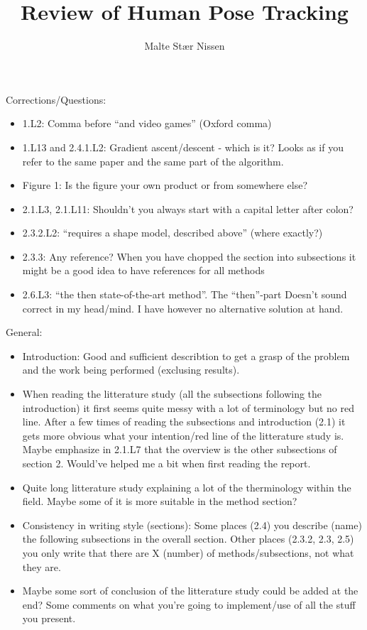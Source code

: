 \documentclass[11pt,a4paper]{article}
\title{Review of Human Pose Tracking}
\author{Malte Stær Nissen}
\begin{document}
\maketitle

\noindent Corrections/Questions:
\begin{itemize}
    \item 1.L2: Comma before ``and video games'' (Oxford comma)
    \item 1.L13 and 2.4.1.L2: Gradient ascent/descent - which is it? Looks as if you refer to
        the same paper and the same part of the algorithm.
    \item Figure 1: Is the figure your own product or from somewhere else?
    \item 2.1.L3, 2.1.L11: Shouldn't you always start with a capital letter after colon?
    \item 2.3.2.L2: ``requires a shape model, described above'' (where exactly?)
    \item 2.3.3: Any reference? When you have chopped the section into
        subsections it might be a good idea to have references for all
        methods
    \item 2.6.L3: ``the then state-of-the-art method''. The ``then''-part Doesn't sound correct
        in my head/mind. I have however no alternative solution at hand.
\end{itemize}

\noindent General:
\begin{itemize}
    \item Introduction: Good and sufficient describtion to get a grasp of the
        problem and the work being performed (exclusing results).
    \item When reading the litterature study (all the subsections following the
        introduction) it first seems quite messy with a
    lot of terminology but no red line. After a few times of reading the
    subsections and introduction (2.1)
    it gets more obvious what your intention/red line of the litterature study
    is. Maybe emphasize in 2.1.L7 that the overview is the other subsections of
    section 2. Would've helped me a bit when first reading the report.

    \item Quite long litterature study explaining a lot of the therminology
        within the field. Maybe some of it is more suitable in the method
        section?
    \item Consistency in writing style (sections): Some places (2.4) you describe (name) the
        following subsections in the overall section. Other places (2.3.2, 2.3,
        2.5) you only write that there are X (number) of methods/subsections,
        not what they are.
    \item Maybe some sort of conclusion of the litterature study could be added
        at the end? Some comments on what you're going to implement/use of all
        the stuff you present.
\end{itemize}
\end{document}
